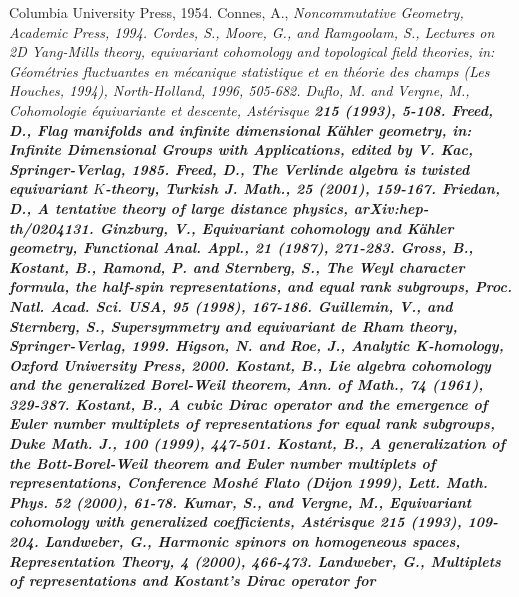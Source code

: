 \documentclass[a4paper,a4paper]{article}
\theoremstyle{conjecture}
\begin{document}
\begin{thebibliography}{99}
Columbia University Press, 1954.
\rm Connes, A.,
\it Noncommutative Geometry,
\rm Academic Press, 1994.
\rm Cordes, S., Moore, G., and Ramgoolam, S.,
\rm Lectures on 2D Yang-Mills theory, equivariant cohomology and topological field theories, in:
\it G\'eom\'etries fluctuantes en m\'ecanique statistique et en
th\'eorie des champs (Les Houches, 1994),
\rm North-Holland, 1996, 505-682.
\rm Duflo, M. and Vergne, M.,
\rm Cohomologie \'equivariante et descente,
\it Ast\'erisque \bf 215
\rm (1993), 5-108.
\rm Freed, D.,
\rm Flag manifolds and infinite dimensional K\"ahler geometry, in:
\it Infinite Dimensional Groups with Applications, edited by V. Kac,
\rm Springer-Verlag, 1985.
\rm Freed, D.,
\rm The Verlinde algebra is twisted equivariant $K$-theory,
\rm Turkish J. Math.,
\bf 25
\rm (2001), 159-167.
\rm Friedan, D.,
\rm A tentative theory of large distance physics,
\rm arXiv:hep-th/0204131.
\rm Ginzburg, V.,
\rm Equivariant cohomology and K\"ahler geometry,
\it Functional Anal. Appl.,
\bf 21
\rm (1987), 271-283.
\rm Gross, B., Kostant, B., Ramond, P. and Sternberg, S.,
\rm The Weyl character formula, the half-spin representations,
and equal rank subgroups,
\it Proc. Natl. Acad. Sci. USA,
\bf 95
\rm (1998), 167-186.
\rm Guillemin, V., and Sternberg, S.,
\it Supersymmetry and equivariant de Rham theory,
\rm Springer-Verlag, 1999.
\rm Higson, N. and Roe, J.,
\it Analytic K-homology,
\rm Oxford University Press, 2000.
\rm Kostant, B., \rm Lie algebra cohomology and the generalized
Borel-Weil theorem, \it Ann. of Math., \bf 74 \rm (1961), 329-387.
\rm Kostant, B.,
\rm A cubic Dirac operator and the emergence of Euler number multiplets
of representations for equal rank subgroups,
\it Duke Math. J.,
\bf 100 \rm (1999), 447-501.
\rm Kostant, B.,
\rm A generalization of the Bott-Borel-Weil theorem and Euler
number multiplets of representations, Conference Mosh\'e Flato (Dijon 1999),
\it Lett. Math. Phys.
\bf 52 \rm (2000), 61-78.
\rm Kumar, S., and Vergne, M.,
\rm Equivariant cohomology with generalized coefficients,
\it Ast\'erisque \bf 215 
\rm (1993), 109-204.
\rm Landweber, G.,
\rm Harmonic spinors on homogeneous spaces,
\it Representation Theory,
\bf 4
\rm (2000), 466-473.
\rm Landweber, G.,
\rm Multiplets of representations and Kostant's Dirac operator for

\end{thebibliography}
\end{document}
